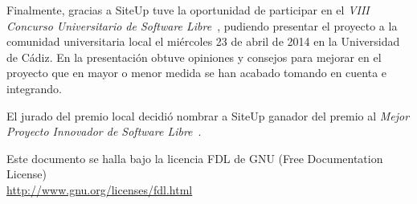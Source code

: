 \documentclass[a4paper,12pt]{article}
\begin{document}
Finalmente, gracias a SiteUp tuve la oportunidad de participar en el \textit{VIII Concurso
  Universitario de Software Libre}~\cite{cusl}, pudiendo presentar el proyecto a
la comunidad universitaria local el miércoles 23 de abril de 2014 en la
Universidad de Cádiz. En la presentación obtuve opiniones y consejos para
mejorar en el proyecto que en mayor o menor medida se han acabado tomando en
cuenta e integrando.

El jurado del premio local decidió nombrar a SiteUp ganador del premio al
\textit{Mejor Proyecto Innovador de Software Libre}~\cite{cusl-local}.





\vspace{0.75cm}

\begin{center}
{\footnotesize Este documento se halla bajo la licencia FDL de GNU (Free Documentation
  License)\\ \url{http://www.gnu.org/licenses/fdl.html} }   
\end{center}
\end{document}
